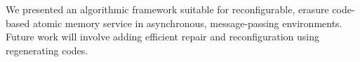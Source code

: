 We presented an algorithmic framework suitable for reconfigurable, 
 erasure code-based atomic memory service in asynchronous,  message-passing environments.
 Future work will involve adding efficient repair and reconfiguration using regenerating codes.
